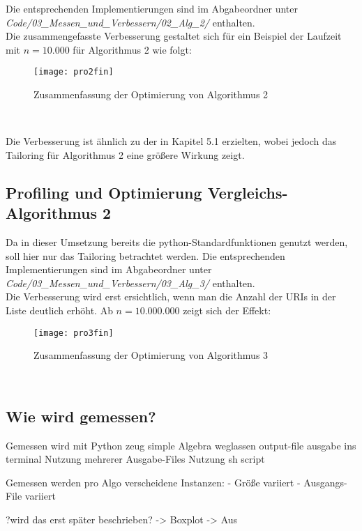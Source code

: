 \documentclass[
10pt, %
a4paper, %
oneside, %
headinclude,footinclude, %
BCOR5mm, %
]{scrartcl}
\begin{document}
Die entsprechenden Implementierungen sind im Abgabeordner unter\\ \textit{Code/03\_Messen\_und\_Verbessern/02\_Alg\_2/} enthalten.\\

Die zusammengefasste Verbesserung gestaltet sich für ein Beispiel der Laufzeit mit \(n=10.000\) für Algorithmus 2 wie folgt:\\
\begin{figure}[h!]
	\centering 
	\texttt{[image: pro2fin]} 
	\caption[Zusammenfassung Optimierung Alg. 2]{Zusammenfassung der Optimierung von Algorithmus 2}
\end{figure}\

Die Verbesserung ist ähnlich zu der in Kapitel 5.1 erzielten, wobei jedoch das Tailoring für Algorithmus 2 eine größere Wirkung zeigt.

\subsection{Profiling und Optimierung Vergleichs-Algorithmus 2}
Da in dieser Umsetzung bereits die python-Standardfunktionen genutzt werden, soll hier nur das Tailoring betrachtet werden. Die entsprechenden Implementierungen sind im Abgabeordner unter \textit{Code/03\_Messen\_und\_Verbessern/03\_Alg\_3/} enthalten.\\

Die Verbesserung wird erst ersichtlich, wenn man die Anzahl der URIs in der Liste deutlich erhöht. Ab \(n=10.000.000\) zeigt sich der Effekt:\\
\begin{figure}[h!]
	\centering 
	\texttt{[image: pro3fin]} 
	\caption[Zusammenfassung Optimierung Alg. 3]{Zusammenfassung der Optimierung von Algorithmus 3}
\end{figure}\



\subsection{Wie wird gemessen?}
Gemessen wird mit Python zeug simple Algebra
weglassen output-file
ausgabe ins terminal
Nutzung mehrerer Ausgabe-Files 
Nutzung sh script

Gemessen werden pro Algo verscheidene Instanzen:
- Größe variiert
- Ausgangs-File variiert

?wird das erst später beschrieben?
-> Boxplot
-> Aus
 
\end{document}
